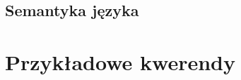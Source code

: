 \documentclass[11pt,a4paper]{article}
\begin{document}
\subsection{Semantyka języka}


\section{Przykładowe kwerendy}

\end{document}
